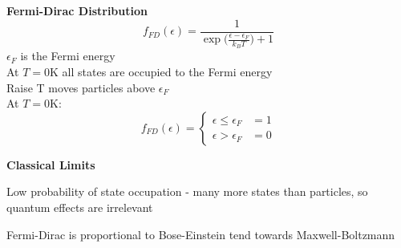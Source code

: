 \documentclass[a4paper, 11pt, normalem]{report}
\begin{document}
\textbf{Fermi-Dirac Distribution}
\begin{equation*}
    f_{FD}(\epsilon) = \frac{1}{\exp\big(\tfrac{\epsilon - \epsilon_F}{k_B T}\big) + 1}
\end{equation*}
$\epsilon_F$ is the Fermi energy \\
At $T = 0$K all states are occupied to the Fermi energy \\
Raise T moves particles above $\epsilon_F$ \\
At $T = 0$K:
\begin{equation*}
    f_{FD}(\epsilon) =
    \begin{cases}
        \epsilon \leq \epsilon_F & = 1 \\
        \epsilon > \epsilon_F & = 0
    \end{cases}
\end{equation*}

\textbf{Classical Limits}

Low probability of state occupation - many more states than particles, so quantum effects are irrelevant

Fermi-Dirac is proportional to Bose-Einstein tend towards Maxwell-Boltzmann
\end{document}

